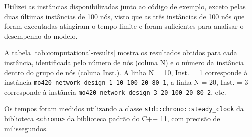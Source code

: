 \documentclass{article}
\begin{document}
Utilizei as instâncias disponibilizadas junto ao código de exemplo, exceto pelas duas últimas instâncias de 100 nós, visto que as três instâncias de 100 nós que foram executadas atingiram o tempo limite e foram suficientes para analisar o desempenho do modelo.

A tabela \ref{tab:computational-results} mostra os resultados obtidos para cada instância, identificada pelo número de nós (coluna N) e o número da instância dentro do grupo de nós (coluna Inst.). A linha N = 10, Inst. = 1 corresponde à instância {\tt mo420\_network\_design\_1\_10\_100\_20\_80\_1}, a linha N = 20, Inst. = 3 corresponde à instância {\tt mo420\_network\_design\_3\_20\_100\_20\_80\_2}, etc.

Os tempos foram medidos utilizando a classe {\tt std::chrono::steady\_clock} da biblioteca {\tt <chrono>} da biblioteca padrão do C++ 11, com precisão de milissegundos.
\end{document}
